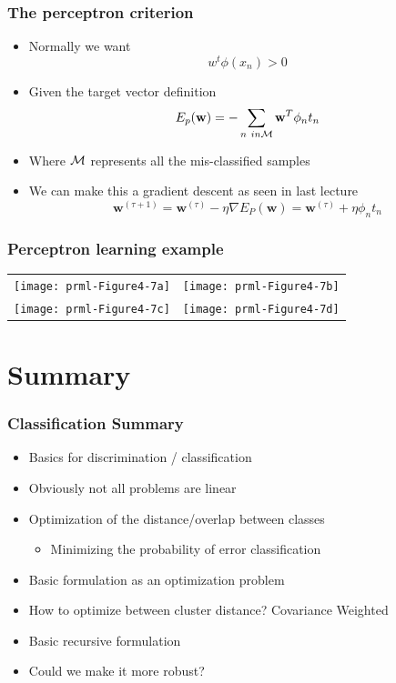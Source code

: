 \documentclass[10pt]{beamer}
\begin{document}
\begin{frame}
  \frametitle{The perceptron criterion}
  \begin{itemize}
  \item Normally we want\@
    \[
    w^t \phi(x_n) > 0
    \]
  \item Given the target vector definition
    \[
    E_p({\mathbf w}) = - \sum_{n \ in {\cal M}} {\mathbf w}^T \phi_n t_n
    \]
  \item Where ${\cal M}$ represents all the mis-classified samples
  \item We can make this a gradient descent as seen in last lecture
    \[
    {\mathbf w}^{(\tau+1)} = {\mathbf w}^{(\tau)} - \eta \nabla E_P({\mathbf w})
                         = {\mathbf w}^{(\tau)} + \eta \phi_n t_n
    \]
  \end{itemize}
\end{frame}

\begin{frame}
  \frametitle{Perceptron learning example}
  \begin{center}
    \begin{tabular}[c]{cc}
      \texttt{[image: prml-Figure4-7a]} &
      \texttt{[image: prml-Figure4-7b]} \\
      \texttt{[image: prml-Figure4-7c]} & 
      \texttt{[image: prml-Figure4-7d]} \\
    \end{tabular}
  \end{center}
\end{frame}

\section{Summary}

\begin{frame}
  \frametitle{Classification Summary}
  \begin{itemize}
  \item Basics for discrimination / classification
  \item Obviously not all problems are linear
  \item Optimization of the distance/overlap between classes
    \begin{itemize}
    \item Minimizing the probability of error classification 
    \end{itemize}
  \item Basic formulation as an optimization problem
  \item How to optimize between cluster distance? Covariance Weighted
  \item Basic recursive formulation
  \item Could we make it more robust? 
  \end{itemize}
\end{frame}
\end{document}
